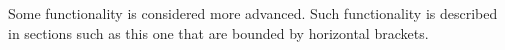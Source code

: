\begin{ccAdvanced}
Some functionality is considered more advanced.
Such functionality is described in sections such as this one that are bounded 
by horizontal brackets.
\end{ccAdvanced}

